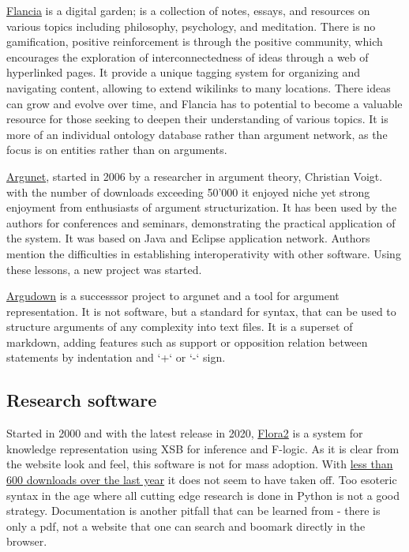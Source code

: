 \documentclass{article}
\begin{document}
\href{https://flancia.org/}{Flancia} is a digital garden; is a collection of notes, essays, and resources on various topics including philosophy, psychology, and meditation. There is no gamification, positive reinforcement is through the positive community, which encourages the exploration of interconnectedness of ideas through a web of hyperlinked pages. It provide a unique tagging system for organizing and navigating content, allowing to extend wikilinks to many locations. There ideas can grow and evolve over time, and Flancia has to potential to become a valuable resource for those seeking to deepen their understanding of various topics. It is more of an individual ontology database rather than argument network, as the focus is on entities rather than on arguments.

\href{http://www.argunet.org/}{Argunet}, started in 2006 by a researcher in argument theory, Christian Voigt. with the number of downloads exceeding 50'000 it enjoyed niche yet strong enjoyment from enthusiasts of argument structurization. It has been used by the authors for conferences and seminars, demonstrating the practical application of the system. It was based on Java and Eclipse application network. Authors mention the difficulties in establishing interoperativity with other software. Using these lessons, a new project was started.

\href{https://argdown.org/}{Argudown} is a successsor project to argunet and a tool for argument representation. It is not software, but a standard for syntax, that can be used to structure arguments of any complexity into text files. It is a superset of markdown, adding features such as support or opposition relation between statements by indentation and `+` or `-` sign.

\subsection{Research software}

Started in 2000 and with the latest release in 2020,
\href{https://flora.sourceforge.net/}{Flora2} is a system for knowledge representation using XSB for inference and F-logic.
As it is clear from the website look and feel, this software is not for mass adoption.
With \href{https://sourceforge.net/projects/flora/files/stats/timeline?dates=2021-12-04\%20to\%202022-12-03&period=daily}{less than 600 downloads over the last year} it does not seem to have taken off.
Too esoteric syntax in the age where all cutting edge research is done in Python is not a good strategy. Documentation is another pitfall that can be learned from - there is only a pdf, not a website that one can search and boomark directly in the browser. 
\end{document}
